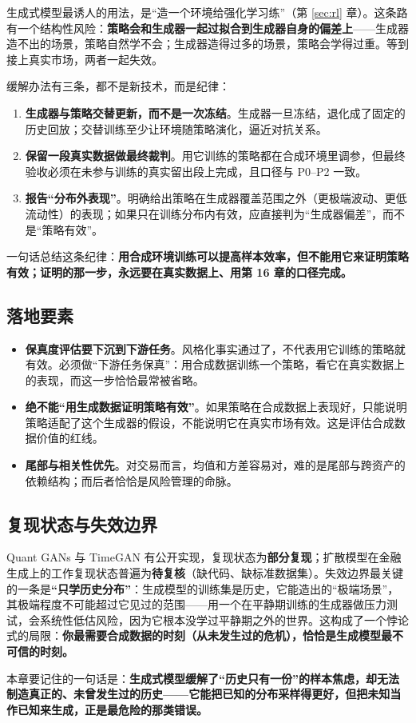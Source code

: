 生成式模型最诱人的用法，是“造一个环境给强化学习练”（第 \ref{sec:rl} 章）。这条路有一个结构性风险：\textbf{策略会和生成器一起过拟合到生成器自身的偏差上}——生成器造不出的场景，策略自然学不会；生成器造得过多的场景，策略会学得过重。等到接上真实市场，两者一起失效。

缓解办法有三条，都不是新技术，而是纪律：

\begin{enumerate}
  \item \textbf{生成器与策略交替更新，而不是一次冻结}。生成器一旦冻结，退化成了固定的历史回放；交替训练至少让环境随策略演化，逼近对抗关系。
  \item \textbf{保留一段真实数据做最终裁判}。用它训练的策略都在合成环境里调参，但最终验收必须在未参与训练的真实留出段上完成，且口径与 P0--P2 一致。
  \item \textbf{报告“分布外表现”}。明确给出策略在生成器覆盖范围之外（更极端波动、更低流动性）的表现；如果只在训练分布内有效，应直接判为“生成器偏差”，而不是“策略有效”。
\end{enumerate}

一句话总结这条纪律：\textbf{用合成环境训练可以提高样本效率，但不能用它来证明策略有效；证明的那一步，永远要在真实数据上、用第 16 章的口径完成。}

\subsection{落地要素}

\begin{itemize}
  \item \textbf{保真度评估要下沉到下游任务}。风格化事实通过了，不代表用它训练的策略就有效。必须做“下游任务保真”：用合成数据训练一个策略，看它在真实数据上的表现，而这一步恰恰最常被省略。
  \item \textbf{绝不能“用生成数据证明策略有效”}。如果策略在合成数据上表现好，只能说明策略适配了这个生成器的假设，不能说明它在真实市场有效。这是评估合成数据价值的红线。
  \item \textbf{尾部与相关性优先}。对交易而言，均值和方差容易对，难的是尾部与跨资产的依赖结构；而后者恰恰是风险管理的命脉。
\end{itemize}

\subsection{复现状态与失效边界}

Quant GANs\cite{wiese2020quantgan} 与 TimeGAN\cite{yoon2019timegan} 有公开实现，复现状态为\textbf{部分复现}；扩散模型在金融生成上的工作复现状态普遍为\textbf{待复核}（缺代码、缺标准数据集）。失效边界最关键的一条是\textbf{“只学历史分布”}：生成模型的训练集是历史，它能造出的“极端场景”，其极端程度不可能超过它见过的范围——用一个在平静期训练的生成器做压力测试，会系统性低估风险，因为它根本没学过平静期之外的世界。这构成了一个悖论式的局限：\textbf{你最需要合成数据的时刻（从未发生过的危机），恰恰是生成模型最不可信的时刻。}

本章要记住的一句话是：\textbf{生成式模型缓解了“历史只有一份”的样本焦虑，却无法制造真正的、未曾发生过的历史——它能把已知的分布采样得更好，但把未知当作已知来生成，正是最危险的那类错误。}
